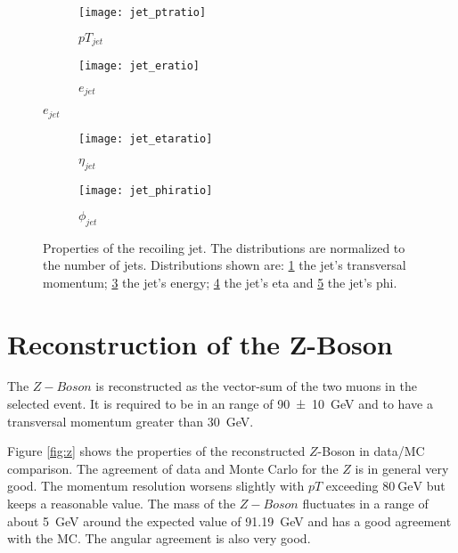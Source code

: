 \begin{figure}[h]
\centering
\begin{subfigure}[b]{0.5\figwidth}
\texttt{[image: jet\_ptratio]}
\caption[Transversal momentum of the recoiling jet]{$pT_{jet}$}
\label{fig:jetpt}
\end{subfigure}
\quad
\begin{subfigure}[b]{0.5\figwidth}
\texttt{[image: jet\_eratio]}
\caption[Energy of the recoiling jet]{$e_{jet}$}
\label{fig:jete}
\end{subfigure}
\end{figure}


\begin{figure}[h]
\centering
\begin{subfigure}[b]{0.5\figwidth}
\texttt{[image: jet\_etaratio]}
\caption[$\eta$ of the recoiling jet]{$\eta_{jet}$}
\label{fig:jeteta}
\end{subfigure}
\quad
\begin{subfigure}[b]{0.5\figwidth}
\texttt{[image: jet\_phiratio]}
\caption[$\phi$ of the recoiling jet]{$\phi_{jet}$}
\label{fig:jetphi}
\end{subfigure}
\caption{Properties of the recoiling jet. The distributions are normalized to the number of jets. Distributions shown are: \ref{fig:jetpt} the jet's transversal momentum; \ref{fig:jete} the jet's energy; \ref{fig:jeteta} the jet's eta and \ref{fig:jetphi} the jet's phi.}
\label{fig:reoilingjet}
\end{figure}

\section{Reconstruction of the Z-Boson}

The $Z-Boson$ is reconstructed as the vector-sum of the two muons in the selected event.
It is required to be in an range of \SI{90+-10}{\GeV} and to have a transversal momentum greater than \SI{30}{\GeV}.

Figure \ref{fig:z} shows the properties of the reconstructed $Z$-Boson in data/MC comparison. The agreement of data and Monte Carlo for the $Z$ is in general very good. The momentum resolution worsens slightly with $pT$ exceeding $\SI{80}{\GeV}$ but keeps a reasonable value. The mass of the $Z-Boson$ fluctuates in a range of about \SI{5}{\GeV} around the expected value of \SI{91.19}{\GeV} and has a good agreement with the MC.
The angular agreement is also very good.


